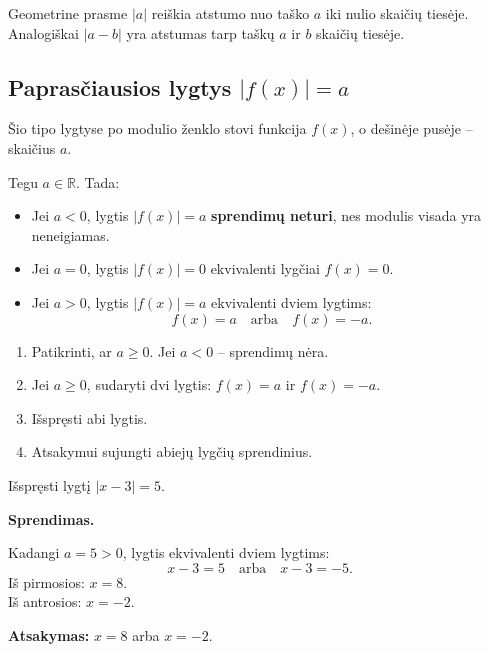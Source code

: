 \begin{remark}
Geometrine prasme $|a|$ reiškia atstumo nuo taško $a$ iki nulio skaičių tiesėje. Analogiškai $|a - b|$ yra atstumas tarp taškų $a$ ir $b$ skaičių tiesėje.
\end{remark}

\subsection{Paprasčiausios lygtys \texorpdfstring{$|f(x)| = a$}{|f(x)| = a}}

Šio tipo lygtyse po modulio ženklo stovi funkcija $f(x)$, o dešinėje pusėje -- skaičius $a$.

\begin{theorem}
Tegu $a \in \mathbb{R}$. Tada:
\begin{itemize}
    \item Jei $a < 0$, lygtis $|f(x)| = a$ \textbf{sprendimų neturi}, nes modulis visada yra neneigiamas.
    \item Jei $a = 0$, lygtis $|f(x)| = 0$ ekvivalenti lygčiai $f(x) = 0$.
    \item Jei $a > 0$, lygtis $|f(x)| = a$ ekvivalenti dviem lygtims:
    \[
    f(x) = a \quad \text{arba} \quad f(x) = -a.
    \]
\end{itemize}
\end{theorem}

\begin{tcolorbox}[colback=green!5!white, colframe=green!50!black, title={Sprendimo algoritmas: $|f(x)| = a$}]
\begin{enumerate}
    \item Patikrinti, ar $a \geq 0$. Jei $a < 0$ -- sprendimų nėra.
    \item Jei $a \geq 0$, sudaryti dvi lygtis: $f(x) = a$ ir $f(x) = -a$.
    \item Išspręsti abi lygtis.
    \item Atsakymui sujungti abiejų lygčių sprendinius.
\end{enumerate}
\end{tcolorbox}

\begin{example}
Išspręsti lygtį $|x - 3| = 5$.

\textbf{Sprendimas.}

Kadangi $a = 5 > 0$, lygtis ekvivalenti dviem lygtims:
\[
x - 3 = 5 \quad \text{arba} \quad x - 3 = -5.
\]
Iš pirmosios: $x = 8$.\\
Iš antrosios: $x = -2$.

\textbf{Atsakymas:} $x = 8$ arba $x = -2$.
\end{example}

